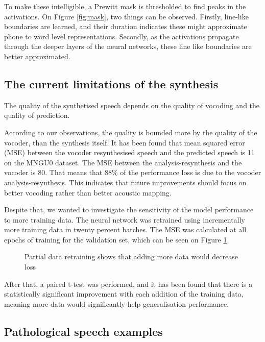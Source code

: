 \documentclass[a4paper]{article}
\begin{document}
To make these intelligible, a Prewitt mask is thresholded to find peaks in the activations.
On Figure \ref{fig:mask}, two things can be observed. Firstly, line-like boundaries are learned, and their duration indicates these might approximate phone to word level representations. Secondly, as the activations propagate through the deeper layers of the neural networks, these line like boundaries are better approximated.

\subsection{The current limitations of the synthesis} \label{section:limitations}
The quality of the synthetised speech depends on the quality of vocoding and
the quality of prediction.

According to our observations, the quality is bounded more by the
quality of the vocoder, than the synthesis itself. It has been found that mean squared error (MSE) between the vocoder resynthesised speech and the predicted speech is 11 on the MNGU0 dataset. The MSE between the analysis-resynthesis and the vocoder is 80. That means that 88\% of the performance loss
is due to the vocoder analysis-resynthesis. This indicates that
future improvements should focus on better vocoding rather than better
acoustic mapping.

Despite that, we wanted to investigate the sensitivity of the model performance to more
training data. The neural network was retrained using incrementally more training data in twenty
percent batches. The MSE was calculated at all epochs of training for the validation set, which
can be seen on Figure \ref{learning_curve}.

\begin{figure}[t]
  \begin{center}
    \scalebox{0.50}{}
    \caption{Partial data retraining shows that adding more data would
      decrease loss}
      \label{learning_curve}
\end{center}
\end{figure}


After that, a paired t-test was performed, and it has been found that there is
a statistically significant improvement with each addition of the training data,
meaning more data would significantly help generalisation performance.

\subsection{Pathological speech examples}
\end{document}
